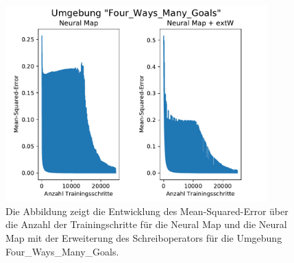 \begin{figure}[ht!]
  \centering
  \includegraphics[height=0.575\textwidth, width=0.9\textwidth]{abbildungen/mem_test_fwmg.pdf}
  \caption{Die Abbildung zeigt die Entwicklung des Mean-Squared-Error über die Anzahl der Trainingschritte für die Neural Map und die Neural Map mit der Erweiterung des Schreiboperators für die Umgebung \glqq Four\_Ways\_Many\_Goals\grqq{}.}
  \label{fig_mem_test_fwmg}
\end{figure}
